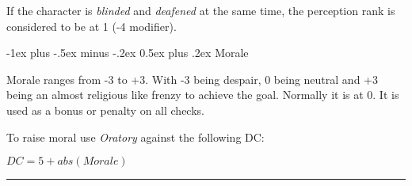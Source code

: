 \documentclass[8pt,landscape,a4paper]{article}
\makeatletter
\renewcommand{\section}{\@startsection{section}{1}{0mm}%
                                {-1ex plus -.5ex minus -.2ex}%
                                {0.5ex plus .2ex}%
                                {\normalfont\large\bfseries}}
\makeatother
\begin{document}
\begin{multicols}{4}
If the character is \emph{blinded} and \emph{deafened} at the same time, the
perception rank is considered to be at 1 (-4 modifier).

\section{Morale}

Morale ranges from -3 to +3. With -3 being despair, 0 being neutral and
+3 being an almost religious like frenzy to achieve the goal. Normally it is
at 0. It is used as a bonus or penalty on all checks.

To raise moral use \emph{Oratory} against the following DC:

\(DC = 5 + abs(Morale)\)

\rule{0.3\linewidth}{0.25pt}
\scriptsize


\end{multicols}
\end{document}
